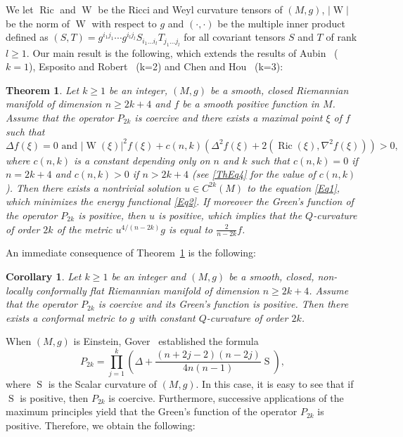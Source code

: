 \documentclass[reqno]{amsart}
\numberwithin{equation}{section}
\DeclareMathOperator{\Scal}{S}
\DeclareMathOperator{\Ricci}{Ric}
\DeclareMathOperator{\Weyl}{W}
\newcommand{\<}{\left<}
\renewcommand{\>}{\right>}
\renewcommand{\[}{\left[}
\renewcommand{\]}{\right]}
\renewcommand{\(}{\left(}
\renewcommand{\)}{\right)}
\newtheorem{theorem}{Theorem}[section]
\newtheorem{corollary}{Corollary}[section]
\begin{document}
\smallskip
We let $\Ricci$ and $\Weyl$ be the Ricci and Weyl curvature tensors of $\(M,g\)$, $\left|\Weyl\right|$ be the norm of $\Weyl$ with respect to $g$ and $\(\cdot,\cdot\)$ be the multiple inner product defined as $\(S,T\)=g^{i_1j_1}\dotsm g^{i_lj_l}S_{i_1\dotsc i_l}T_{j_1\dotsc j_l}$ for all covariant tensors $S$ and $T$ of rank $l\ge1$. Our main result is the following, which extends the results of Aubin~\cite{Aub} ($k=1$), Esposito and Robert~\cite{EspRob} (k=2) and Chen and Hou~\cite{ChenHou} (k=3):

\begin{theorem}\label{Th}
Let $k\ge1$ be an integer, $\(M,g\)$ be a smooth, closed Riemannian manifold of dimension $n\ge 2k+4$ and $f$ be a smooth positive function in $M$. Assume that the operator $P_{2k}$ is coercive and there exists a maximal point $\xi$ of $f$ such that
\begin{equation}\label{ThEq1}
\Delta f\(\xi\)=0\text{ and }\left|\Weyl\(\xi\)\right|^2f\(\xi\)+c\(n,k\)\(\Delta^2f\(\xi\)+2\(\Ricci\(\xi\),\nabla^2f\(\xi\)\)\)>0,
\end{equation}
where $c\(n,k\)$ is a constant depending only on $n$ and $k$ such that $c\(n,k\)=0$ if $n=2k+4$ and $c\(n,k\)>0$ if $n>2k+4$ (see \eqref{ThEq4} for the value of $c\(n,k\)$). Then there exists a nontrivial solution $u\in C^{2k}\(M\)$ to the equation \eqref{Eq1}, which minimizes the energy functional \eqref{Eq2}. If moreover the Green's function of the operator $P_{2k}$ is positive, then $u$ is positive, which implies that the $Q$-curvature of order $2k$ of the metric $u^{4/\(n-2k\)}g$ is equal to $\frac{2}{n-2k}f$. 
\end{theorem}

An immediate consequence of Theorem~\ref{Th} is the following:

\begin{corollary}
Let $k\ge1$ be an integer and $\(M,g\)$ be a smooth, closed, non-locally conformally flat Riemannian manifold of dimension $n\ge 2k+4$. Assume that the operator $P_{2k}$ is coercive and its Green's function is positive. Then there exists a conformal metric to $g$ with constant $Q$-curvature of order $2k$. 
\end{corollary}

When $\(M,g\)$ is Einstein, Gover~\cite{Gov} established the formula
$$P_{2k}=\prod_{j=1}^k\(\Delta+\frac{\(n+2j-2\)\(n-2j\)}{4n\(n-1\)}\Scal\),$$
where $\Scal$ is the Scalar curvature of $\(M,g\)$. In this case, it is easy to see that  if $\Scal$ is positive, then $P_{2k}$ is coercive. Furthermore, successive applications of the maximum principles yield that the Green's function of the operator $P_{2k}$ is positive. Therefore, we obtain the following:
\end{document}
